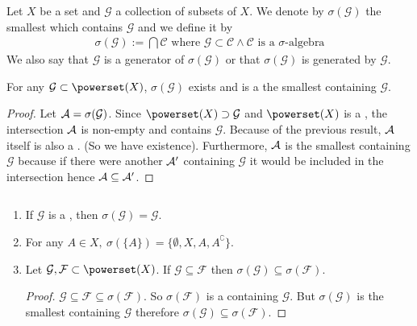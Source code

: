 \newcommand{\calG}{\mathcal{G}}
\newcommand{\calF}{\mathcal{F}}
\newcommand{\calC}{\mathcal{C}}
\begin{dfn}
	Let $X$ be a set and $\calG$ a collection of subsets of $X$. We denote by $\sigma(\calG)$ the smallest \siga which contains $\calG$ and we define it by
	\begin{align*}
		\sigma(\calG) := \bigcap \calC\text{ where } \calG \subset \calC \land \calC \text{ is a } \sigma\text{-algebra}
	\end{align*}
	We also say that $\calG$ is a generator of $\sigma(\calG)$ or that $\sigma(\calG)$ is generated by $\calG$.
\end{dfn}

\begin{thm}
	For any $\calG \subset \powerset(X)$, $\sigma (\calG)$ exists and is a the smallest \siga containing $\calG$.
	
	\begin{proof}
		Let $\sa = \sigma(\calG)$. Since $\powerset(X) \supset \calG$ and $\powerset(X)$ is a \siga, the intersection $\mathcal{A}$ is non-empty and contains $\calG$. Because of the previous result, $\mathcal{A}$ itself is also a \siga. (So we have existence). Furthermore, $\mathcal{A}$ is the smallest \siga containing $\calG$ because if there were another \siga $\mathcal{A}'$ containing $\calG$ it would be included in the intersection hence $\mathcal{A} \subseteq \mathcal{A}'$.
	\end{proof}
\end{thm}

\begin{remark}
	\label{rem:generators}
	$ $\newline
	\begin{enumerate}
		\item If $\calG$ is a \siga, then $\sigma(\calG) = \calG$.
		\item For any $A \in X,\ \sigma(\{A\}) = \{\emptyset, X, A, A^\complement\}$.
		\item Let $\calG, \mathcal{F} \subset \powerset(X)$. If $\calG \subseteq \mathcal{F}$ then $\sigma (\calG) \subseteq \sigma(\mathcal{F})$.
		\begin{proof}
			$\calG \subseteq \mathcal{F} \subseteq \sigma(\mathcal{F})$. So $\sigma(\mathcal{F})$ is a \siga containing $\calG$. But $\sigma(\mathcal{G})$ is the smallest \siga containing $\calG$ therefore $\sigma(\calG) \subseteq \sigma(\mathcal{F})$.
		\end{proof}
	\end{enumerate}
\end{remark}

